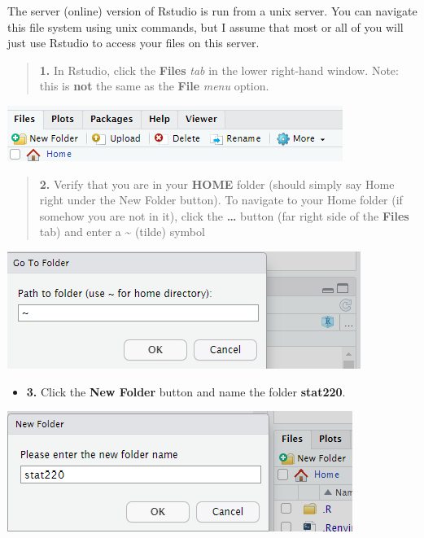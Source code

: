 \documentclass[
]{book}
\providecommand{\tightlist}{%
  \setlength{\itemsep}{0pt}\setlength{\parskip}{0pt}}
\begin{document}
The server (online) version of Rstudio is run from a unix server. You
can navigate this file system using unix commands, but I assume that
most or all of you will just use Rstudio to access your files on this
server.

\begin{quote}
\textbf{1.} In Rstudio, click the \textbf{Files} \emph{tab} in the lower right-hand
window. Note: this is \textbf{not} the same as the \textbf{File} \emph{menu}
option.
\end{quote}

\includegraphics{img/maize_files.png}

\begin{quote}
\textbf{2.} Verify that you are in your \textbf{HOME} folder (should simply
say Home right under the New Folder button). To navigate to your
Home folder (if somehow you are not in it), click the \textbf{\ldots{}} button
(far right side of the \textbf{Files} tab) and enter a \textasciitilde{} (tilde) symbol
\end{quote}

\includegraphics{img/maize_home.png}

\begin{itemize}
\tightlist
\item
  \textbf{3.} Click the \textbf{New Folder} button and name the folder
  \textbf{stat220}.
\end{itemize}

\includegraphics{img/maize_newfolder.png}
\end{document}
